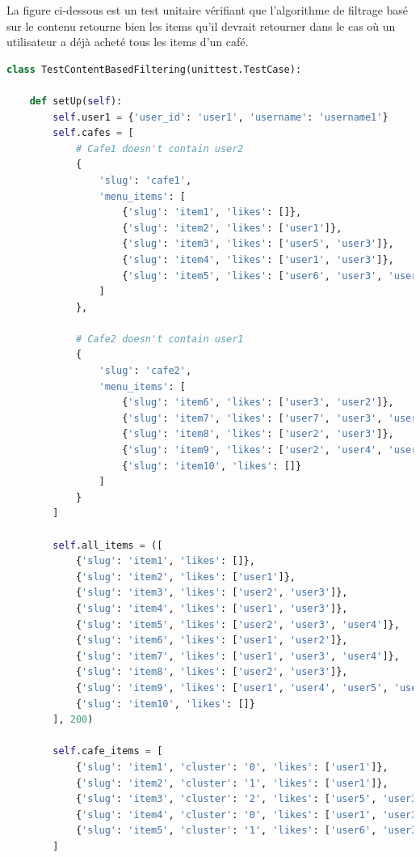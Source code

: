 \documentclass[11pt]{article}
\begin{document}
La figure ci-dessous est un test unitaire vérifiant que l'algorithme de filtrage basé sur le contenu retourne bien les items qu'il devrait retourner dans le cas où un utilisateur a déjà acheté tous les items d'un café.

\begin{lstlisting}[language=Python, caption=Méthode setUp]
class TestContentBasedFiltering(unittest.TestCase):

    def setUp(self):
        self.user1 = {'user_id': 'user1', 'username': 'username1'}
        self.cafes = [
            # Cafe1 doesn't contain user2
            {
                'slug': 'cafe1',
                'menu_items': [
                    {'slug': 'item1', 'likes': []}, 
                    {'slug': 'item2', 'likes': ['user1']},
                    {'slug': 'item3', 'likes': ['user5', 'user3']},
                    {'slug': 'item4', 'likes': ['user1', 'user3']},
                    {'slug': 'item5', 'likes': ['user6', 'user3', 'user4']}
                ]
            }, 

            # Cafe2 doesn't contain user1
            {
                'slug': 'cafe2',
                'menu_items': [
                    {'slug': 'item6', 'likes': ['user3', 'user2']}, 
                    {'slug': 'item7', 'likes': ['user7', 'user3', 'user4']},
                    {'slug': 'item8', 'likes': ['user2', 'user3']},
                    {'slug': 'item9', 'likes': ['user2', 'user4', 'user5', 'user6']},
                    {'slug': 'item10', 'likes': []}
                ]
            }
        ]

        self.all_items = ([
            {'slug': 'item1', 'likes': []}, 
            {'slug': 'item2', 'likes': ['user1']},
            {'slug': 'item3', 'likes': ['user2', 'user3']},
            {'slug': 'item4', 'likes': ['user1', 'user3']},
            {'slug': 'item5', 'likes': ['user2', 'user3', 'user4']},
            {'slug': 'item6', 'likes': ['user1', 'user2']}, 
            {'slug': 'item7', 'likes': ['user1', 'user3', 'user4']},
            {'slug': 'item8', 'likes': ['user2', 'user3']},
            {'slug': 'item9', 'likes': ['user1', 'user4', 'user5', 'user6']},
            {'slug': 'item10', 'likes': []}
        ], 200)

        self.cafe_items = [
            {'slug': 'item1', 'cluster': '0', 'likes': ['user1']}, 
            {'slug': 'item2', 'cluster': '1', 'likes': ['user1']},
            {'slug': 'item3', 'cluster': '2', 'likes': ['user5', 'user3']},
            {'slug': 'item4', 'cluster': '0', 'likes': ['user1', 'user3']},
            {'slug': 'item5', 'cluster': '1', 'likes': ['user6', 'user3', 'user4']}
        ]
\end{lstlisting}
\end{document}
